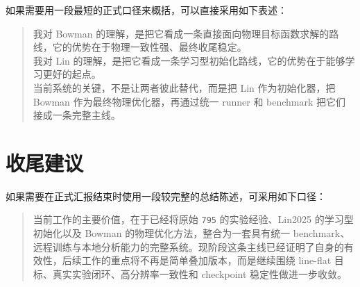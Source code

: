 \documentclass[12pt,a4paper]{ctexart}
\begin{document}
如果需要用一段最短的正式口径来概括，可以直接采用如下表述：

\begin{quote}
我对 Bowman 的理解，是把它看成一条直接面向物理目标函数求解的路线，它的优势在于物理一致性强、最终收尾稳定。\\
我对 Lin 的理解，是把它看成一条学习型初始化路线，它的优势在于能够学习更好的起点。\\
当前系统的关键，不是让两者彼此替代，而是把 Lin 作为初始化器，把 Bowman 作为最终物理优化器，再通过统一 runner 和 benchmark 把它们接成一条完整主线。
\end{quote}

\section{收尾建议}

如果需要在正式汇报结束时使用一段较完整的总结陈述，可采用如下口径：

\begin{quote}
当前工作的主要价值，在于已经将原始 \texttt{795} 的实验经验、Lin2025 的学习型初始化以及 Bowman 的物理优化方法，整合为一套具有统一 benchmark、远程训练与本地分析能力的完整系统。现阶段这条主线已经证明了自身的有效性，后续工作的重点将不再是简单叠加版本，而是继续围绕 line-flat 目标、真实实验闭环、高分辨率一致性和 checkpoint 稳定性做进一步收敛。
\end{quote}
\end{document}
